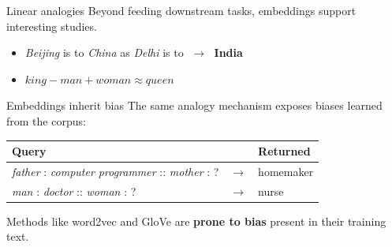 \documentclass[aspectratio=169,11pt]{beamer}
\begin{document}
\begin{frame}{Linear analogies}
Beyond feeding downstream tasks, embeddings support interesting studies.
\vspace{3mm}
\begin{center}
\end{center}
\begin{itemize}
  \item \emph{Beijing} is to \emph{China} as \emph{Delhi} is to \underline{\quad}
        $\;\rightarrow\;$ \textbf{India}
  \item $\textit{king} - \textit{man} + \textit{woman} \approx \textit{queen}$
\end{itemize}
\end{frame}

\begin{frame}{Embeddings inherit bias}
The same analogy mechanism exposes biases learned from the corpus:
\vspace{3mm}
\begin{center}
\begin{tabular}{@{}lcl@{}}
\toprule
Query & & Returned \\
\midrule
\emph{father} : \emph{computer programmer} :: \emph{mother} : ? & $\rightarrow$ & \alert{homemaker} \\
\emph{man} : \emph{doctor} :: \emph{woman} : ? & $\rightarrow$ & \alert{nurse} \\
\bottomrule
\end{tabular}
\end{center}
\vspace{3mm}
Methods like word2vec and GloVe are \textbf{prone to bias} present in their
training text.
\end{frame}
\end{document}
